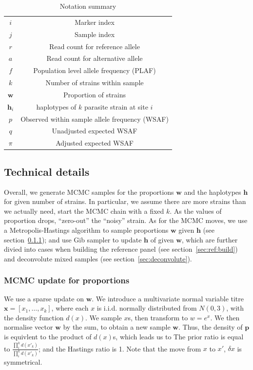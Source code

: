 \documentclass{bioinfo}
\begin{document}
\begin{methods}
\begin{table}[h]\centering
\begin{tabular}{c|c}\hline
$i$              & Marker index\\
$j$              & Sample index \\
$r$              & Read count for reference allele \\
$a$              & Read count for alternative allele \\
$f$              & Population level allele frequency (PLAF) \\
$k$              & Number of strains within sample \\
$\mathbf w$      & Proportion of strains \\
$\mathbf{h}_{i}$ & haplotypes of $k$ parasite strain at site $i$ \\
$p$              & Observed within sample allele frequency (WSAF) \\
$q$              & Unadjusted expected WSAF  \\
$\pi$            & Adjusted expected WSAF \\\hline
\end{tabular}
\caption{Notation summary}
\end{table}

\subsection{Technical details}
Overall, we generate MCMC samples for the proportions $\mathbf w$ and the haplotypes $\mathbf h$ for given number of strains. In particular, we assume there are more strains than we actually need, start the MCMC chain with a fixed $k$. As the values of proportion drops, ``zero-out'' the ``noisy'' strain. As for the MCMC moves, we use a Metropolis-Hastings algorithm to sample proportions $\mathbf w$ given $\mathbf h$ (see section~\ref{sec:updateP}); and use Gib sampler to update $\mathbf h$ of given $\mathbf w$, which are further divied into cases when building the reference panel (see section~\ref{sec:ref:build}) and deconvolute mixed samples (see section~\ref{sec:deconvolute}).

\subsubsection{MCMC update for proportions}\label{sec:updateP}
We use a sparse update on $\mathbf w$. We introduce a multivariate normal variable titre ${\mathbf x} = [x_1,\dots,x_k]$, where each $x$ is i.i.d. normally distributed from $N(0, 3)$, with the density function $d(x)$. We sample $x$s, then transform to $w = e^x$. We then normalise vector $\mathbf w$ by the sum, to obtain a new sample ${\mathbf w}$. Thus, the density of $\mathbf p$ is equivlent to the product of $d(x)$s, which leads us to
The prior ratio is equal to $\frac{\prod_i^k d(x'_k)}{\prod_i^k d(x'_k)}$; and the Hastings ratio is 1. Note that the move from $x$ to $x'$, $\delta x$ is symmetrical.


\end{methods}
\end{document}
